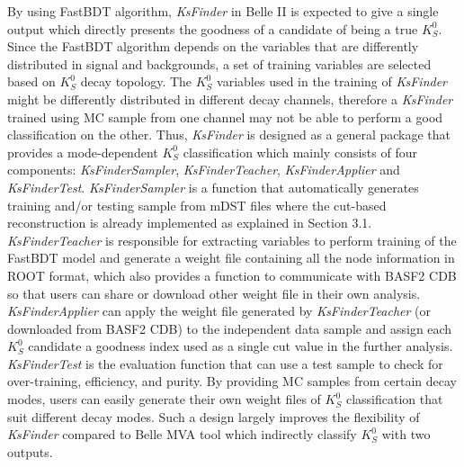 By using FastBDT algorithm, \textit{KsFinder} in Belle II is expected to give a single output which directly presents the goodness of a candidate of being a true $K_S^0$. Since the FastBDT algorithm depends on the variables that are differently distributed in signal and backgrounds, a set of training variables are selected based on $K_S^0$ decay topology.  The $K_S^0$ variables used in the training of \textit{KsFinder} might be differently distributed in different decay channels, therefore a \textit{KsFinder} trained using MC sample from one channel may not be able to perform a good classification on the other. Thus, \textit{KsFinder} is designed as a general package that provides a mode-dependent $K_S^0$ classification which mainly consists of four components: \textit{KsFinderSampler}, \textit{KsFinderTeacher}, \textit{KsFinderApplier} and \textit{KsFinderTest}. \textit{KsFinderSampler} is a function that automatically generates training and/or testing sample from mDST files where the cut-based reconstruction is already implemented as explained in Section 3.1. \textit{KsFinderTeacher} is responsible for extracting variables to perform training of the FastBDT model and generate a weight file containing all the node information in ROOT format, which also provides a function to communicate with BASF2 CDB so that users can share or download other weight file in their own analysis. \textit{KsFinderApplier} can apply the weight file generated by \textit{KsFinderTeacher} (or downloaded from BASF2 CDB) to the independent data sample and assign each $K_S^0$ candidate a goodness index used as a single cut value in the further analysis. \textit{KsFinderTest} is the evaluation function that can use a test sample to check for over-training, efficiency, and purity.  By providing MC samples from certain decay modes, users can easily generate their own weight files of $K_S^0$ classification that suit different decay modes. Such a design largely improves the flexibility of \textit{KsFinder} compared to Belle MVA tool which indirectly classify $K_S^0$ with two outputs. 

